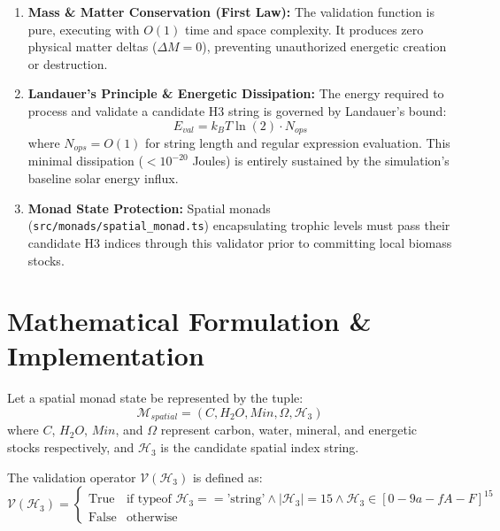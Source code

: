 \documentclass[11pt, a4paper]{article}
\begin{document}
\begin{enumerate}
    \item \textbf{Mass \& Matter Conservation (First Law):} The validation function is pure, executing with $O(1)$ time and space complexity. It produces zero physical matter deltas ($\Delta M = 0$), preventing unauthorized energetic creation or destruction.
    \item \textbf{Landauer's Principle \& Energetic Dissipation:} The energy required to process and validate a candidate H3 string is governed by Landauer's bound:
    \begin{equation}
        E_{val} = k_B T \ln(2) \cdot N_{ops}
    \end{equation}
    where $N_{ops} = O(1)$ for string length and regular expression evaluation. This minimal dissipation ($< 10^{-20}$ Joules) is entirely sustained by the simulation's baseline solar energy influx.
    \item \textbf{Monad State Protection:} Spatial monads (\texttt{src/monads/spatial\_monad.ts}) encapsulating trophic levels must pass their candidate H3 indices through this validator prior to committing local biomass stocks.
\end{enumerate}

\section{Mathematical Formulation \& Implementation}
Let a spatial monad state be represented by the tuple:
\begin{equation}
    \mathcal{M}_{spatial} = (C, H_2O, Min, \Omega, \mathcal{H}_3)
\end{equation}
where $C$, $H_2O$, $Min$, and $\Omega$ represent carbon, water, mineral, and energetic stocks respectively, and $\mathcal{H}_3$ is the candidate spatial index string.

The validation operator $\mathcal{V}(\mathcal{H}_3)$ is defined as:
\begin{equation}
    \mathcal{V}(\mathcal{H}_3) = \begin{cases} 
    \text{True} & \text{if } \text{typeof } \mathcal{H}_3 == \text{'string'} \land |\mathcal{H}_3| = 15 \land \mathcal{H}_3 \in [0-9a-fA-F]^{15} \\
    \text{False} & \text{otherwise}
    \end{cases}
\end{equation}
\end{document}
